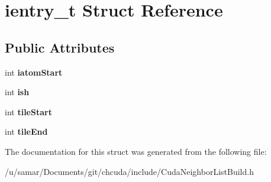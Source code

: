 \hypertarget{structientry__t}{}\section{ientry\+\_\+t Struct Reference}
\label{structientry__t}
\subsection*{Public Attributes}
\begin{DoxyCompactItemize}
\item 
\hypertarget{structientry__t_acf6f06c51e58b2511ff15a1fe57be1fd}{}\label{structientry__t_acf6f06c51e58b2511ff15a1fe57be1fd} 
int {\bfseries iatom\+Start}
\item 
\hypertarget{structientry__t_a379a46e5f7973bd653cea1096f8d979d}{}\label{structientry__t_a379a46e5f7973bd653cea1096f8d979d} 
int {\bfseries ish}
\item 
\hypertarget{structientry__t_a49b14ca044df9ef7fa7251c025a1d1a8}{}\label{structientry__t_a49b14ca044df9ef7fa7251c025a1d1a8} 
int {\bfseries tile\+Start}
\item 
\hypertarget{structientry__t_a770eaa48237b0ac89dd751d29b11e3f6}{}\label{structientry__t_a770eaa48237b0ac89dd751d29b11e3f6} 
int {\bfseries tile\+End}
\end{DoxyCompactItemize}


The documentation for this struct was generated from the following file\+:\begin{DoxyCompactItemize}
\item 
/u/samar/\+Documents/git/chcuda/include/Cuda\+Neighbor\+List\+Build.\+h\end{DoxyCompactItemize}

